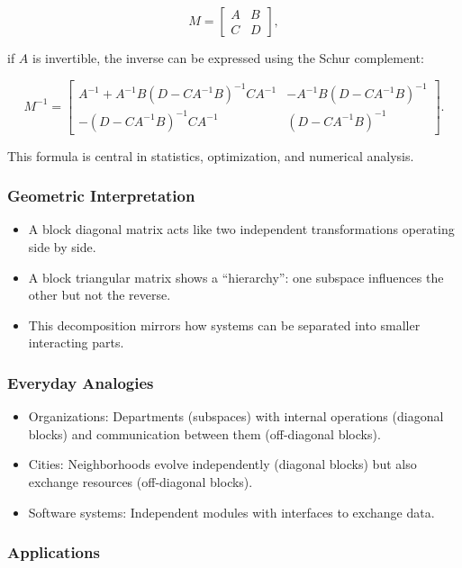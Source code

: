\documentclass[
  letterpaper,
  DIV=11,
  numbers=noendperiod]{scrreprt}
\providecommand{\tightlist}{%
  \setlength{\itemsep}{0pt}\setlength{\parskip}{0pt}}
\begin{document}
\[
M = \begin{bmatrix} A & B \\ C & D \end{bmatrix},
\]

if \(A\) is invertible, the inverse can be expressed using the Schur
complement:

\[
M^{-1} = \begin{bmatrix} 
A^{-1} + A^{-1}B(D-CA^{-1}B)^{-1}CA^{-1} & -A^{-1}B(D-CA^{-1}B)^{-1} \\ 
-(D-CA^{-1}B)^{-1}CA^{-1} & (D-CA^{-1}B)^{-1} 
\end{bmatrix}.
\]

This formula is central in statistics, optimization, and numerical
analysis.

\subsubsection{Geometric
Interpretation}\label{geometric-interpretation-11}

\begin{itemize}
\tightlist
\item
  A block diagonal matrix acts like two independent transformations
  operating side by side.
\item
  A block triangular matrix shows a ``hierarchy'': one subspace
  influences the other but not the reverse.
\item
  This decomposition mirrors how systems can be separated into smaller
  interacting parts.
\end{itemize}

\subsubsection{Everyday Analogies}\label{everyday-analogies-46}

\begin{itemize}
\tightlist
\item
  Organizations: Departments (subspaces) with internal operations
  (diagonal blocks) and communication between them (off-diagonal
  blocks).
\item
  Cities: Neighborhoods evolve independently (diagonal blocks) but also
  exchange resources (off-diagonal blocks).
\item
  Software systems: Independent modules with interfaces to exchange
  data.
\end{itemize}

\subsubsection{Applications}\label{applications-12}
\end{document}
